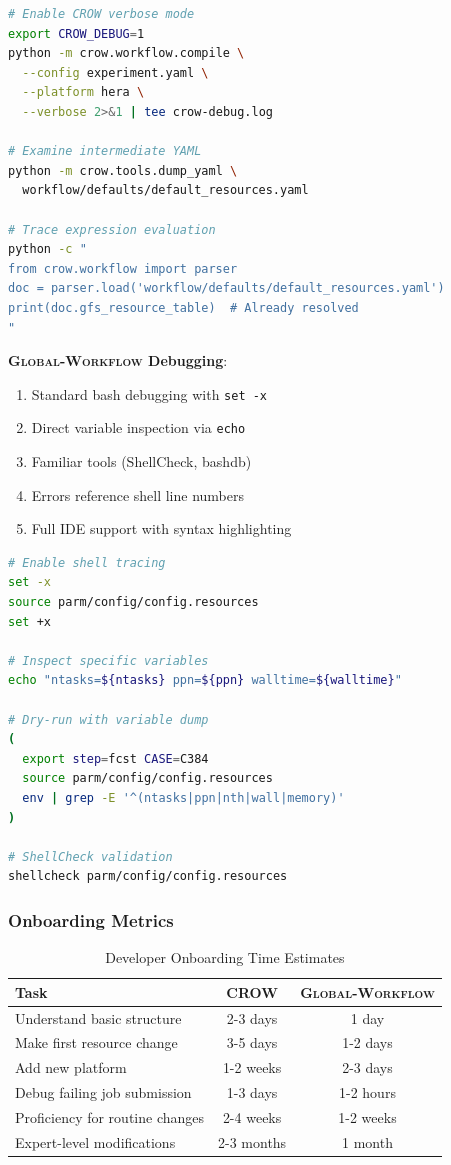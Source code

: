 \documentclass[11pt,twoside]{article}
\newcommand{\crow}{\textsc{CROW}}
\newcommand{\gw}{\textsc{Global-Workflow}}
\begin{document}
\begin{lstlisting}[language=Bash, caption={\crow{} Debug Workflow}]
# Enable CROW verbose mode
export CROW_DEBUG=1
python -m crow.workflow.compile \
  --config experiment.yaml \
  --platform hera \
  --verbose 2>&1 | tee crow-debug.log

# Examine intermediate YAML
python -m crow.tools.dump_yaml \
  workflow/defaults/default_resources.yaml

# Trace expression evaluation
python -c "
from crow.workflow import parser
doc = parser.load('workflow/defaults/default_resources.yaml')
print(doc.gfs_resource_table)  # Already resolved
"
\end{lstlisting}

\textbf{\gw{} Debugging}:
\begin{enumerate}[leftmargin=2em]
    \item Standard bash debugging with \texttt{set -x}
    \item Direct variable inspection via \texttt{echo}
    \item Familiar tools (ShellCheck, bashdb)
    \item Errors reference shell line numbers
    \item Full IDE support with syntax highlighting
\end{enumerate}

\begin{lstlisting}[language=Bash, caption={\gw{} Debug Workflow}]
# Enable shell tracing
set -x
source parm/config/config.resources
set +x

# Inspect specific variables
echo "ntasks=${ntasks} ppn=${ppn} walltime=${walltime}"

# Dry-run with variable dump
(
  export step=fcst CASE=C384
  source parm/config/config.resources
  env | grep -E '^(ntasks|ppn|nth|wall|memory)'
)

# ShellCheck validation
shellcheck parm/config/config.resources
\end{lstlisting}

\subsubsection{Onboarding Metrics}

\begin{table}[H]
\centering
\caption{Developer Onboarding Time Estimates}
\label{tab:onboarding}
\begin{tabular}{@{}lcc@{}}
\toprule
\textbf{Task} & \textbf{\crow{}} & \textbf{\gw{}} \\
\midrule
Understand basic structure & 2-3 days & 1 day \\
Make first resource change & 3-5 days & 1-2 days \\
Add new platform & 1-2 weeks & 2-3 days \\
Debug failing job submission & 1-3 days & 1-2 hours \\
Proficiency for routine changes & 2-4 weeks & 1-2 weeks \\
Expert-level modifications & 2-3 months & 1 month \\
\bottomrule
\end{tabular}
\end{table}
\end{document}
